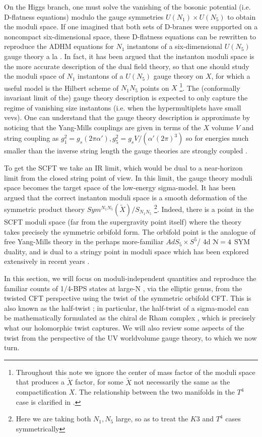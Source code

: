 \documentclass[../main.tex]{subfiles}
\begin{document}
On the Higgs branch, one must solve the vanishing of the bosonic potential (i.e. D-flatness equations) modulo the gauge symmetries $U(N_1)\times U(N_5)$ to obtain the moduli space. 
If one imagined that both sets of D-branes were supported on a noncompact six-dimensional space, these D-flatness equations can be rewritten to reproduce the ADHM equations for $N_1$ instantons of a six-dimensional $U(N_5)$ gauge theory a la \cite{WittenADHM}. 
In fact, it has been argued that the instanton moduli space is the more accurate description of the dual field theory, so that one should study the moduli space of $N_1$ instantons of a $U(N_5)$ gauge theory on $X$, for which a useful model is the Hilbert scheme of $N_1 N_5$ points on $X$ \footnote{Throughout this note we ignore the center of mass factor of the moduli space that produces a $\tilde{X}$ factor, for some $\tilde{X}$ not necessarily the same as the compactification $X$. The relationship between the two manifolds in the $T^4$ case is clarified in \cite{GiveonKutasovSeiberg}.}. The (conformally invariant limit of the) gauge theory description is expected to only capture the regime of vanishing size instantons (i.e. when the hypermultiplets have small vevs). One can understand that the gauge theory description is approximate by noticing that the Yang-Mills couplings are given in terms of the $X$ volume $V$ and string coupling as $g_1^2 = g_s (2 \pi \alpha'), g_5^2 = g_s V/(\alpha' (2\pi)^3)$ so for energies much smaller than the inverse string length the gauge theories are strongly coupled \cite{Davidetal}. 


To get the SCFT we take an IR limit, which would be dual to a near-horizon limit from the closed string point of view. In this limit, the gauge theory moduli space becomes the target space of the low-energy sigma-model. It has been argued that the correct instanton moduli space is a smooth deformation of the symmetric product theory $Sym^{N_1 N_5}(\tilde{X})/S_{N_1 N_5}$ \footnote{Here we are taking both $N_1, N_5$ large, so as to treat the $K3$ and $T^4$ cases symmetrically}. Indeed, there is a point in the SCFT moduli space (far from the supergravity point itself) where the theory takes precisely the symmetric orbifold form. The orbifold point is the analogue of free Yang-Mills theory in the perhaps more-familiar $AdS_5\times S^5$/ 4d $\mathcal N =4$ SYM duality, and is dual to a stringy point in moduli space which has been explored extensively in recent years \cite{Eberhardtetal}.

In this section, we will focus on moduli-independent quantities and reproduce the familiar counts of 1/4-BPS states at large-N \cite{deBoerEG}, via the elliptic genus, from the twisted CFT perspective using the twist of the symmetric orbifold CFT. This is also known as the half-twist \cite{Witten, Kapustin}; in particular, the half-twist of a sigma-model can be mathematically formulated as the chiral de Rham complex \cite{Kapustin, Malikovetal}, which is precisely what our holomorphic twist captures. We will also review some aspects of the twist from the perspective of the UV worldvolume gauge theory, to which we now turn. 
 
\end{document}
